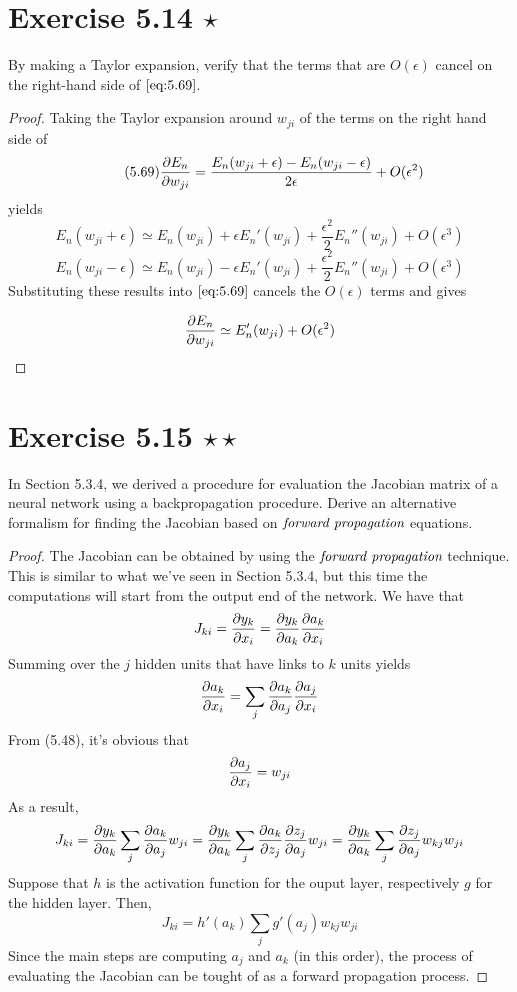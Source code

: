 \section*{Exercise 5.14 $\star$}
By making a Taylor expansion, verify that the terms that are $O(\epsilon)$ 
cancel on the right-hand side of $\eqref{eq:5.69}$.

\vspace{1em}

\begin{proof}
    Taking the Taylor expansion around $w_{ji}$ of the terms on the right hand side of
    \begin{equation}\label{eq:5.69}\tag{5.69}
        \pdv{E_n}{w_{ji}} = \frac{E_n(w_{ji} + \epsilon) - E_n(w_{ji} - \epsilon)}{2\epsilon}
        + O(\epsilon^2)
    \end{equation}
    yields
    \[
        E_n(w_{ji} + \epsilon) \simeq E_n(w_{ji}) + \epsilon E_n'(w_{ji}) 
        + \frac{\epsilon^2}{2} E_n''(w_{ji}) + O(\epsilon^3)
    \] 
    \[
        E_n(w_{ji} - \epsilon) \simeq E_n(w_{ji}) - \epsilon E_n'(w_{ji}) 
        + \frac{\epsilon^2}{2} E_n''(w_{ji}) + O(\epsilon^3)
    \] 
    Substituting these results into $\eqref{eq:5.69}$ cancels
    the $O(\epsilon)$ terms and gives

    \[
        \pdv{E_n}{w_{ji}} \simeq E_n'(w_{ji}) + O(\epsilon^2)
    \] 
\end{proof}

\section*{Exercise 5.15 $\star \star$}
In Section 5.3.4, we derived a procedure for evaluation the Jacobian
matrix of a neural network using a backpropagation procedure.
Derive an alternative formalism for finding the Jacobian based on 
$\emph{forward propagation}$ equations.

\vspace{1em}

\begin{proof}
    The Jacobian can be obtained by using the $\emph{forward propagation}$ technique.
    This is similar to what we've seen in Section 5.3.4, but this time the computations
    will start from the output end of the network. We have that
    \[
        J_{ki} = \pdv{y_k}{x_i} = \pdv{y_k}{a_k} \pdv{a_k}{x_i}
    \] 
    Summing over the $j$ hidden units that have links to $k$ units yields
    \[
        \pdv{a_k}{x_i} = \sum_{j} \pdv{a_k}{a_j} \pdv{a_j}{x_i}
    \] 
    From (5.48), it's obvious that
    \[
        \pdv{a_j}{x_i} = w_{ji}
    \] 
    As a result,
    \[
        J_{ki} = \pdv{y_k}{a_k} \sum_{j} \pdv{a_k}{a_j} w_{ji}
        = \pdv{y_k}{a_k} \sum_{j} \pdv{a_k}{z_j} \pdv{z_j}{a_j} w_{ji}
        = \pdv{y_k}{a_k} \sum_{j} \pdv{z_j}{a_j} w_{kj} w_{ji}
    \] 
    Suppose that $h$ is the activation function for the ouput layer,
    respectively $g$ for the hidden layer. Then,
    \[
        J_{ki} = h'(a_k) \sum_{j} g'(a_j) w_{kj} w_{ji}
    \] 
    Since the main steps are computing $a_j$ and $a_k$ (in this order), the
    process of evaluating the Jacobian can be tought of as a 
    forward propagation process.
\end{proof}

